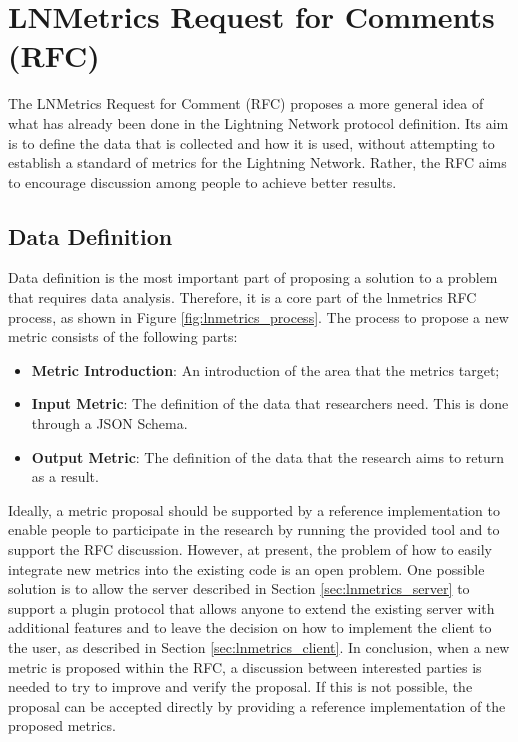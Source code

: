 \section{LNMetrics Request for Comments (RFC)}

The LNMetrics Request for Comment (RFC) proposes a more general idea of what has 
already been done in the Lightning Network protocol definition. Its aim is to define
the data that is collected and how it is used, without attempting to establish a standard
of metrics for the Lightning Network. Rather, the RFC aims to encourage discussion
among people to achieve better results.

\subsection{Data Definition}
\label{sec:data_definition}

Data definition is the most important part of proposing a solution to a 
problem that requires data analysis. Therefore, it is a core part of the 
lnmetrics RFC process, as shown in Figure \ref{fig:lnmetrics_process}. The 
process to propose a new metric consists of the following parts:

\begin{itemize}
    \item \textbf{Metric Introduction}: An introduction of the area that the metrics target;
    \item \textbf{Input Metric}: The definition of the data that researchers need. This is done through a JSON Schema.
    \item \textbf{Output Metric}: The definition of the data that the research aims to return as a result.
\end{itemize}

Ideally, a metric proposal should be supported by a reference implementation 
to enable people to participate in the research by running the provided tool and
to support the RFC discussion. However, at present, the problem of how to easily 
integrate new metrics into the existing code is an open problem. One possible 
solution is to allow the server described in Section \ref{sec:lnmetrics_server} 
to support a plugin protocol that allows anyone to extend the existing server 
with additional features and to leave the decision on how to implement the client 
to the user, as described in Section \ref{sec:lnmetrics_client}. In conclusion, 
when a new metric is proposed within the RFC, a discussion between interested 
parties is needed to try to improve and verify the proposal. If this is not 
possible, the proposal can be accepted directly by providing a reference 
implementation of the proposed metrics.

